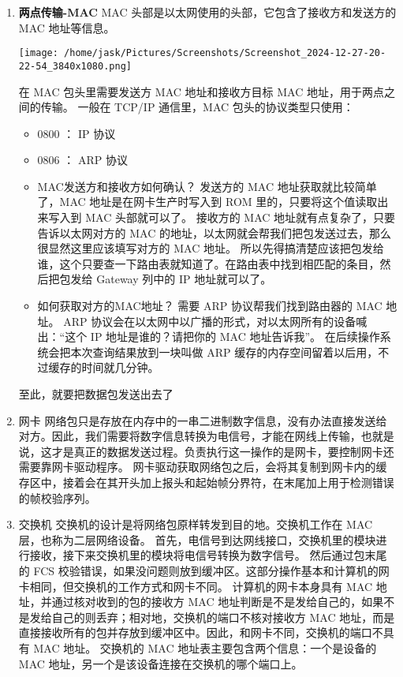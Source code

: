 \documentclass[11pt]{article}
\begin{document}
\begin{enumerate}
\item \textbf{两点传输-MAC}
MAC 头部是以太网使用的头部，它包含了接收方和发送方的 MAC 地址等信息。
\begin{center}
\texttt{[image: /home/jask/Pictures/Screenshots/Screenshot\_2024-12-27-20-22-54\_3840x1080.png]}
\end{center}
在 MAC 包头里需要发送方 MAC 地址和接收方目标 MAC 地址，用于两点之间的传输。
一般在 TCP/IP 通信里，MAC 包头的协议类型只使用：
\begin{itemize}
\item 0800 ： IP 协议
\item 0806 ： ARP 协议
\item MAC发送方和接收方如何确认？
发送方的 MAC 地址获取就比较简单了，MAC 地址是在网卡生产时写入到 ROM 里的，只要将这个值读取出来写入到 MAC 头部就可以了。
接收方的 MAC 地址就有点复杂了，只要告诉以太网对方的 MAC 的地址，以太网就会帮我们把包发送过去，那么很显然这里应该填写对方的 MAC 地址。
所以先得搞清楚应该把包发给谁，这个只要查一下路由表就知道了。在路由表中找到相匹配的条目，然后把包发给 Gateway 列中的 IP 地址就可以了。
\item 如何获取对方的MAC地址？
需要 ARP 协议帮我们找到路由器的 MAC 地址。
ARP 协议会在以太网中以广播的形式，对以太网所有的设备喊出：“这个 IP 地址是谁的？请把你的 MAC 地址告诉我”。
在后续操作系统会把本次查询结果放到一块叫做 ARP 缓存的内存空间留着以后用，不过缓存的时间就几分钟。
\end{itemize}
至此，就要把数据包发送出去了
\item 网卡
网络包只是存放在内存中的一串二进制数字信息，没有办法直接发送给对方。因此，我们需要将数字信息转换为电信号，才能在网线上传输，也就是说，这才是真正的数据发送过程。负责执行这一操作的是网卡，要控制网卡还需要靠网卡驱动程序。
网卡驱动获取网络包之后，会将其复制到网卡内的缓存区中，接着会在其开头加上报头和起始帧分界符，在末尾加上用于检测错误的帧校验序列。
\item 交换机
交换机的设计是将网络包原样转发到目的地。交换机工作在 MAC 层，也称为二层网络设备。
首先，电信号到达网线接口，交换机里的模块进行接收，接下来交换机里的模块将电信号转换为数字信号。
然后通过包末尾的 FCS 校验错误，如果没问题则放到缓冲区。这部分操作基本和计算机的网卡相同，但交换机的工作方式和网卡不同。
计算机的网卡本身具有 MAC 地址，并通过核对收到的包的接收方 MAC 地址判断是不是发给自己的，如果不是发给自己的则丢弃；相对地，交换机的端口不核对接收方 MAC 地址，而是直接接收所有的包并存放到缓冲区中。因此，和网卡不同，交换机的端口不具有 MAC 地址。
交换机的 MAC 地址表主要包含两个信息：一个是设备的 MAC 地址，另一个是该设备连接在交换机的哪个端口上。

\end{enumerate}
\end{document}
